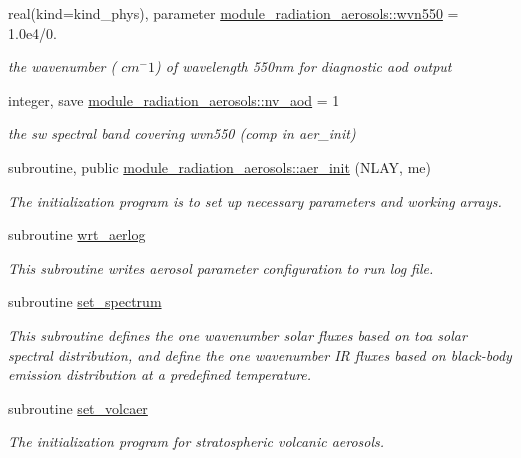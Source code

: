 \begin{DoxyCompactItemize}
real(kind=kind\+\_\+phys), parameter \hyperlink{group__module__radiation__aerosols_ga4555a127ac5bab48353628ea81c55e4e}{module\+\_\+radiation\+\_\+aerosols\+::wvn550} = 1.\+0e4/0.
\begin{DoxyCompactList}\small\item\em the wavenumber ( $cm^-1$) of wavelength 550nm for diagnostic aod output \end{DoxyCompactList}\item 
integer, save \hyperlink{group__module__radiation__aerosols_ga112670c954eb372efc017253b1096b17}{module\+\_\+radiation\+\_\+aerosols\+::nv\+\_\+aod} = 1
\begin{DoxyCompactList}\small\item\em the sw spectral band covering wvn550 (comp in aer\+\_\+init) \end{DoxyCompactList}\item 
subroutine, public \hyperlink{group__module__radiation__aerosols_ga58ac70a5189ef62c63cf2c87465a030a}{module\+\_\+radiation\+\_\+aerosols\+::aer\+\_\+init} (N\+L\+AY, me)
\begin{DoxyCompactList}\small\item\em The initialization program is to set up necessary parameters and working arrays. \end{DoxyCompactList}\item 
subroutine \hyperlink{group__module__radiation__aerosols_ga3135fdf318002f9d56dd2d93225f4aac}{wrt\+\_\+aerlog}
\begin{DoxyCompactList}\small\item\em This subroutine writes aerosol parameter configuration to run log file. \end{DoxyCompactList}\item 
subroutine \hyperlink{group__module__radiation__aerosols_gaa7fe6dc2964bc474a132b93aaab82cb0}{set\+\_\+spectrum}
\begin{DoxyCompactList}\small\item\em This subroutine defines the one wavenumber solar fluxes based on toa solar spectral distribution, and define the one wavenumber IR fluxes based on black-\/body emission distribution at a predefined temperature. \end{DoxyCompactList}\item 
subroutine \hyperlink{group__module__radiation__aerosols_ga9b4558586df512eab092565549b835e2}{set\+\_\+volcaer}
\begin{DoxyCompactList}\small\item\em The initialization program for stratospheric volcanic aerosols. \end{DoxyCompactList}\item 

\end{DoxyCompactItemize}
